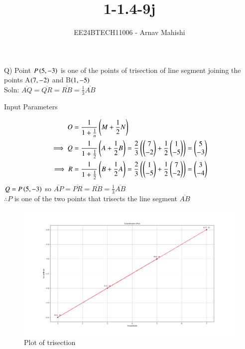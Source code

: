 \documentclass[journal]{IEEEtran}
\begin{document}

\vspace{3cm}

\title{1-1.4-9j}
\author{EE24BTECH11006 - Arnav Mahishi}
{\let\newpage\relax\maketitle}

\renewcommand{\thefigure}{\theenumi}
\renewcommand{\thetable}{\theenumi}
\setlength{\intextsep}{10pt} %


\renewcommand{\thetable}{\theenumi}

Q) Point $P\left(5,-3\right)$ is one of the points of trisection of line segment joining the points A$\left(7,-2\right)$ and B$\left(1,-5\right)$
\\Soln: $\overline{AQ}=\overline{QR}=\overline{RB}=\frac{1}{3}\overline{AB}$
\begin{table}[h!]    
  \centering
  
  \caption{Input Parameters}
\end{table}

\begin{align}
O&=\frac{1}{1+\frac{1}{n}}\left(M+\frac{1}{2}N\right)\\
\implies Q&=\frac{1}{1+\frac{1}{2}}\left(A+\frac{1}{2}B\right)=
\frac{2}{3}\left(\begin{pmatrix}7\\-2\end{pmatrix}+\frac{1}{2}\begin{pmatrix}1\\-5\end{pmatrix}\right)=\begin{pmatrix}5\\-3\end{pmatrix}\\
\implies R&=\frac{1}{1+\frac{1}{2}}\left(B+\frac{1}{2}A\right)=
\frac{2}{3}\left(\begin{pmatrix}1\\-5\end{pmatrix}+\frac{1}{2}\begin{pmatrix}7\\-2\end{pmatrix}\right)=\begin{pmatrix}3\\-4\end{pmatrix}
\end{align}
$Q=P\left(5,-3\right)$ so $\overline{AP}=\overline{PR}=\overline{RB}=\frac{1}{3}\overline{AB}$  \\
$\therefore P$ is one of the two points that trisects the line segment $\overline{AB}$
\begin{figure}[h!]
   \centering
   \includegraphics[width=0.7\linewidth]{figs/Figure_1.png}
   \caption{Plot of trisection}
   \label{stemplot}
\end{figure}
\end{document}

